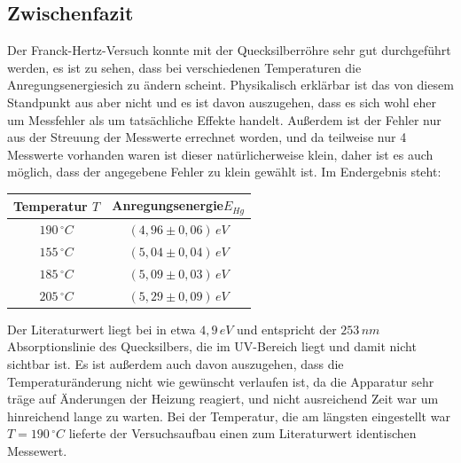 \subsection{Zwischenfazit}
Der Franck-Hertz-Versuch konnte mit der Quecksilberröhre  sehr gut durchgeführt werden, es ist zu sehen, dass bei verschiedenen Temperaturen die Anregungsenergiesich zu ändern scheint. Physikalisch erklärbar ist das von diesem Standpunkt aus aber nicht und es ist davon auszugehen, dass es sich wohl eher um Messfehler als um tatsächliche Effekte handelt. Außerdem ist der Fehler nur aus der Streuung der Messwerte errechnet worden, und da teilweise nur 4 Messwerte vorhanden waren ist dieser natürlicherweise klein, daher ist es auch möglich, dass der angegebene Fehler zu klein gewählt ist. Im Endergebnis steht:
\begin{center}
\begin{tabular}{c|c}
Temperatur \(T\) & Anregungsenergie\(E_{Hg}\)\\\hline
\(190\, ^\circ C\) & \(\left( 4,96 \pm 0,06 \right) \, eV\) \\
\(155\, ^\circ C\) & \(\left( 5,04 \pm 0,04 \right) \, eV\) \\
\(185\, ^\circ C\) & \(\left( 5,09 \pm 0,03 \right) \, eV\) \\
\(205\, ^\circ C\) & \(\left( 5,29 \pm 0,09 \right) \, eV\) \\
\end{tabular}
\end{center}
Der Literaturwert liegt bei in etwa \(4,9\, eV\) und entspricht der  \(253\, nm\) Absorptionslinie des Quecksilbers, die im UV-Bereich liegt und damit nicht sichtbar ist. Es ist außerdem auch davon auszugehen, dass die Temperaturänderung nicht wie gewünscht verlaufen ist, da die Apparatur sehr träge auf Änderungen der Heizung reagiert, und nicht ausreichend Zeit war um hinreichend lange zu warten. Bei der Temperatur, die am längsten eingestellt war \(T=190\, ^\circ C\) lieferte der Versuchsaufbau einen zum Literaturwert identischen Messewert.